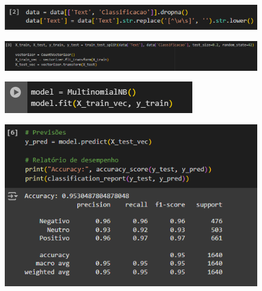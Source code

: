 \documentclass[12pt]{article}
\begin{document}
\begin{figure}[h]
	\centering
	\includegraphics[width=.8\textwidth]{image2.png}
\end{figure}

\begin{figure}[h]
	\centering
	\includegraphics[width=.8\textwidth]{image3.png}
\end{figure}

\begin{figure}[h]
	\centering
	\includegraphics[width=.8\textwidth]{image4.png}
\end{figure}

\begin{figure}[h]
	\centering
	\includegraphics[width=.8\textwidth]{image5.png}
\end{figure}
\end{document}
